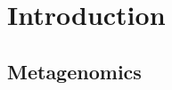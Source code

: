 \documentclass[twocolumn]{bmcart}%
\begin{document}
\begin{frontmatter}
\begin{fmbox}
\begin{abstractbox}

\begin{keyword}
\end{keyword}


\end{abstractbox}
%
\end{fmbox}%

\end{frontmatter}


\section*{Introduction}
\subsection*{Metagenomics}
\end{document}
